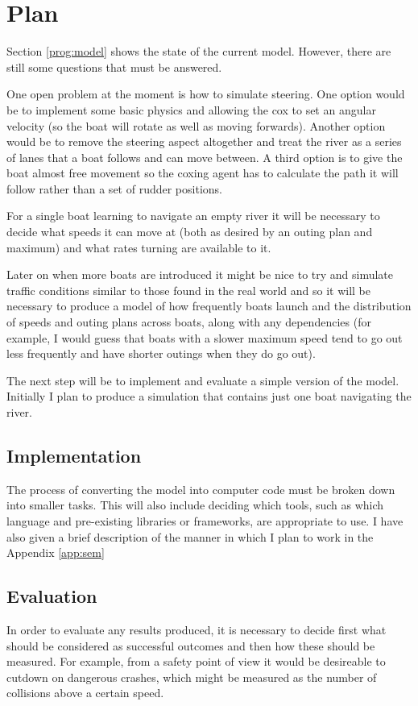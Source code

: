 \section{Plan}

Section \ref{prog:model} shows the state of the current
model. However, there are still some questions that must be
answered.

One open problem at the moment is how to simulate steering. One option would be to implement some basic physics and allowing the cox to set an angular velocity (so the boat will rotate as well as moving forwards). Another option would be to remove the steering aspect altogether and treat the river as a series of lanes that a boat follows and can move between. A third option is to give the boat almost free movement so the coxing agent has to calculate the path it will follow rather than a set of rudder positions.

For a single boat learning to navigate an empty river it will be necessary to decide what speeds it can
move at (both as desired by an outing plan and maximum) and what rates
turning are available to it. 

Later on when more boats are introduced
it might be nice to try and simulate traffic conditions similar to
those found in the real world and
so it will be necessary to produce a model of how frequently boats
launch and the distribution of speeds and outing plans across boats,
along with any dependencies (for example, I would guess that boats
with a slower maximum speed tend to go out less frequently and have
shorter outings when they do go out).

The next step will be to implement and evaluate a simple version of the model. Initially I plan to produce a simulation that contains just one boat navigating the river. 

\subsection{Implementation}
The process of converting
the model into computer code must be broken down into smaller
tasks. This will also include deciding which tools, such as which
language and pre-existing libraries or frameworks, are appropriate 
to use. I have also given a brief description of the manner in which I
plan to work in the Appendix \ref{app:sem}

\subsection{Evaluation}
In order to evaluate any results produced, it is necessary to decide
first what should be considered as successful outcomes and then how
these should be measured. For example, from a safety point of view it
would be desireable to cutdown on dangerous crashes, which might be
measured as the number of collisions above a certain speed.
